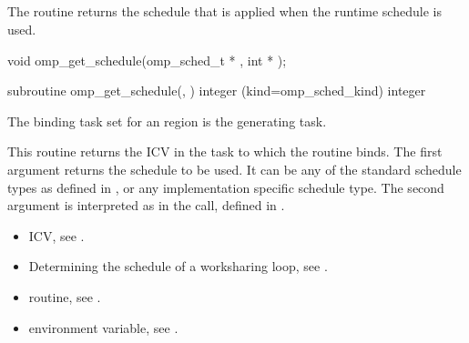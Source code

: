 \subsection{}
\label{subsec:omp_get_schedule}
\summary
The  routine returns the schedule that is applied when the 
runtime schedule is used. 
\format
\begin{ccppspecific}
\begin{boxedcode}
void omp\_get\_schedule(omp\_sched\_t * , int * ); 
\end{boxedcode}
\end{ccppspecific}

\begin{fortranspecific}
\begin{boxedcode}
subroutine omp\_get\_schedule(, ) 
integer (kind=omp\_sched\_kind)  
integer 
\end{boxedcode}
\end{fortranspecific}

\binding
The binding task set for an  region is the generating task. 

\effect
This routine returns the  ICV in the task to which the routine binds. The 
first argument  returns the schedule to be used. It can be any of the standard 
schedule types as defined in 
, 
or any implementation specific 
schedule type. The second argument is interpreted as in the  call, 
defined in 
.

\crossreferences
\begin{itemize}
\item {} ICV, see 
.

\item Determining the schedule of a worksharing loop, see 
.

\item {} routine, see 
.

\item {} environment variable, see 
.
\end{itemize}









